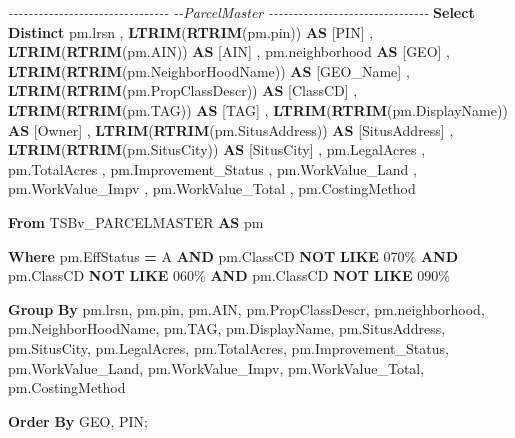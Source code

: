 \documentclass[
]{article}
\newenvironment{Shaded}{\begin{snugshade}}{\end{snugshade}}
\newcommand{\CommentTok}[1]{\textcolor[rgb]{0.56,0.35,0.01}{\textit{#1}}}
\newcommand{\FunctionTok}[1]{\textcolor[rgb]{0.13,0.29,0.53}{\textbf{#1}}}
\newcommand{\KeywordTok}[1]{\textcolor[rgb]{0.13,0.29,0.53}{\textbf{#1}}}
\newcommand{\NormalTok}[1]{#1}
\newcommand{\OperatorTok}[1]{\textcolor[rgb]{0.81,0.36,0.00}{\textbf{#1}}}
\newcommand{\StringTok}[1]{\textcolor[rgb]{0.31,0.60,0.02}{#1}}
\begin{document}
\begin{Shaded}
\begin{Highlighting}[]

  \CommentTok{{-}{-}{-}{-}{-}{-}{-}{-}{-}{-}{-}{-}{-}{-}{-}{-}{-}{-}{-}{-}{-}{-}{-}{-}{-}{-}{-}{-}{-}{-}{-}{-}}
  \CommentTok{{-}{-}ParcelMaster}
  \CommentTok{{-}{-}{-}{-}{-}{-}{-}{-}{-}{-}{-}{-}{-}{-}{-}{-}{-}{-}{-}{-}{-}{-}{-}{-}{-}{-}{-}{-}{-}{-}{-}{-}}
  \KeywordTok{Select} \KeywordTok{Distinct}
\NormalTok{  pm.lrsn}
\NormalTok{,  }\FunctionTok{LTRIM}\NormalTok{(}\FunctionTok{RTRIM}\NormalTok{(pm.pin)) }\KeywordTok{AS}\NormalTok{ [PIN]}
\NormalTok{,  }\FunctionTok{LTRIM}\NormalTok{(}\FunctionTok{RTRIM}\NormalTok{(pm.AIN)) }\KeywordTok{AS}\NormalTok{ [AIN]}
\NormalTok{,  pm.neighborhood }\KeywordTok{AS}\NormalTok{ [GEO]}
\NormalTok{,  }\FunctionTok{LTRIM}\NormalTok{(}\FunctionTok{RTRIM}\NormalTok{(pm.NeighborHoodName)) }\KeywordTok{AS}\NormalTok{ [GEO\_Name]}
\NormalTok{,  }\FunctionTok{LTRIM}\NormalTok{(}\FunctionTok{RTRIM}\NormalTok{(pm.PropClassDescr)) }\KeywordTok{AS}\NormalTok{ [ClassCD]}
\NormalTok{,  }\FunctionTok{LTRIM}\NormalTok{(}\FunctionTok{RTRIM}\NormalTok{(pm.TAG)) }\KeywordTok{AS}\NormalTok{ [TAG]}
\NormalTok{,  }\FunctionTok{LTRIM}\NormalTok{(}\FunctionTok{RTRIM}\NormalTok{(pm.DisplayName)) }\KeywordTok{AS}\NormalTok{ [Owner]}
\NormalTok{,  }\FunctionTok{LTRIM}\NormalTok{(}\FunctionTok{RTRIM}\NormalTok{(pm.SitusAddress)) }\KeywordTok{AS}\NormalTok{ [SitusAddress]}
\NormalTok{,  }\FunctionTok{LTRIM}\NormalTok{(}\FunctionTok{RTRIM}\NormalTok{(pm.SitusCity)) }\KeywordTok{AS}\NormalTok{ [SitusCity]}
\NormalTok{,  pm.LegalAcres}
\NormalTok{,  pm.TotalAcres}
\NormalTok{,  pm.Improvement\_Status}
\NormalTok{,  pm.WorkValue\_Land}
\NormalTok{,  pm.WorkValue\_Impv}
\NormalTok{,  pm.WorkValue\_Total}
\NormalTok{,  pm.CostingMethod}
  
  \KeywordTok{From}\NormalTok{ TSBv\_PARCELMASTER }\KeywordTok{AS}\NormalTok{ pm}
  
  \KeywordTok{Where}\NormalTok{ pm.EffStatus }\OperatorTok{=} \StringTok{\textquotesingle{}A\textquotesingle{}}
    \KeywordTok{AND}\NormalTok{ pm.ClassCD }\KeywordTok{NOT} \KeywordTok{LIKE} \StringTok{\textquotesingle{}070\%\textquotesingle{}}
    \KeywordTok{AND}\NormalTok{ pm.ClassCD }\KeywordTok{NOT} \KeywordTok{LIKE} \StringTok{\textquotesingle{}060\%\textquotesingle{}}
    \KeywordTok{AND}\NormalTok{ pm.ClassCD }\KeywordTok{NOT} \KeywordTok{LIKE} \StringTok{\textquotesingle{}090\%\textquotesingle{}}
    
  \KeywordTok{Group} \KeywordTok{By}
\NormalTok{  pm.lrsn,}
\NormalTok{  pm.pin,}
\NormalTok{  pm.AIN,}
\NormalTok{  pm.PropClassDescr,}
\NormalTok{  pm.neighborhood,}
\NormalTok{  pm.NeighborHoodName,}
\NormalTok{  pm.TAG,}
\NormalTok{  pm.DisplayName,}
\NormalTok{  pm.SitusAddress,}
\NormalTok{  pm.SitusCity,}
\NormalTok{  pm.LegalAcres,}
\NormalTok{  pm.TotalAcres,}
\NormalTok{  pm.Improvement\_Status,}
\NormalTok{  pm.WorkValue\_Land,}
\NormalTok{  pm.WorkValue\_Impv,}
\NormalTok{  pm.WorkValue\_Total,}
\NormalTok{  pm.CostingMethod}

\KeywordTok{Order} \KeywordTok{By}\NormalTok{ GEO, PIN;}
\end{Highlighting}
\end{Shaded}
\end{document}
